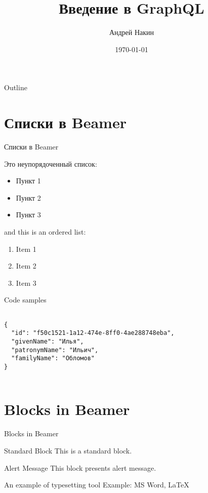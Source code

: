 \documentclass{beamer}
\title{Введение в GraphQL}
\author{Андрей Накин}
\date{\today}
\begin{document}
\begin{frame}
    \titlepage 
\end{frame}



\begin{frame}{Outline}
    \tableofcontents
\end{frame}


\section{Списки в Beamer}
\begin{frame}{Списки в Beamer}

Это неупорядоченный список:
\begin{itemize}
    \item Пункт 1
    \item Пункт 2
    \item Пункт 3
\end{itemize}

and this is an ordered list:
\begin{enumerate}
    \item Item 1
    \item Item 2
    \item Item 3
\end{enumerate}

\end{frame}



\begin{frame}[fragile]{Code samples}

\begin{verbatim}

{
  "id": "f50c1521-1a12-474e-8ff0-4ae288748eba",
  "givenName": "Илья",
  "patronymName": "Ильич",
  "familyName": "Обломов"
}
  
\end{verbatim}

\end{frame}

\section{Blocks in Beamer}
\begin{frame}{Blocks in Beamer}
    \begin{block}{Standard Block}
        This is a standard block.
    \end{block}
    \begin{alertblock}{Alert Message}
        This block presents alert message.
    \end{alertblock}
    \begin{exampleblock}{An example of typesetting tool}
        Example: MS Word, \LaTeX{}
    \end{exampleblock}
\end{frame} 
\end{document}
